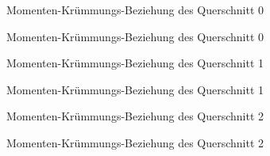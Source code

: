 \documentclass[
  11pt,
  letterpaper,
]{scrreprt}
\begin{document}
\begin{figure}[H]


\caption{\label{fig-qs_0}Momenten-Krümmungs-Beziehung des Querschnitt 0}

\end{figure}%

\begin{figure}[H]


\caption{\label{fig-m_chi_0}Momenten-Krümmungs-Beziehung des Querschnitt
0}

\end{figure}%

\begin{figure}[H]


\caption{\label{fig-qs_1}Momenten-Krümmungs-Beziehung des Querschnitt 1}

\end{figure}%

\begin{figure}[H]


\caption{\label{fig-m_chi_1}Momenten-Krümmungs-Beziehung des Querschnitt
1}

\end{figure}%

\begin{figure}[H]


\caption{\label{fig-qs_2}Momenten-Krümmungs-Beziehung des Querschnitt 2}

\end{figure}%

\begin{figure}[H]


\caption{\label{fig-m_chi_2}Momenten-Krümmungs-Beziehung des Querschnitt
2}

\end{figure}%
\end{document}

